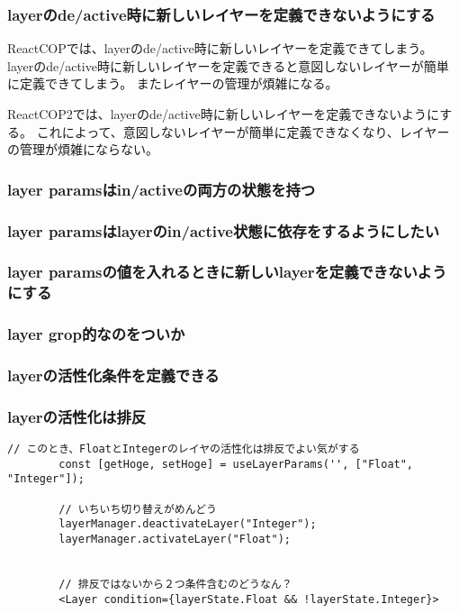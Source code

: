 \documentclass{jsarticle}
\begin{document}
    \subsubsection{layerのde/active時に新しいレイヤーを定義できないようにする}
    ReactCOPでは、layerのde/active時に新しいレイヤーを定義できてしまう。
    layerのde/active時に新しいレイヤーを定義できると意図しないレイヤーが簡単に定義できてしまう。
    またレイヤーの管理が煩雑になる。

    ReactCOP2では、layerのde/active時に新しいレイヤーを定義できないようにする。
    これによって、意図しないレイヤーが簡単に定義できなくなり、レイヤーの管理が煩雑にならない。


    \subsubsection{layer paramsはin/activeの両方の状態を持つ}

    \subsubsection{layer paramsはlayerのin/active状態に依存をするようにしたい}

    \subsubsection{layer paramsの値を入れるときに新しいlayerを定義できないようにする}

    \subsubsection{layer grop的なのをついか}

    \subsubsection{layerの活性化条件を定義できる}

    \subsubsection{layerの活性化は排反}
        \begin{lstlisting}[caption=hoge,label=fuga]
        // このとき、FloatとIntegerのレイヤの活性化は排反でよい気がする
        const [getHoge, setHoge] = useLayerParams('', ["Float", "Integer"]);

        // いちいち切り替えがめんどう
        layerManager.deactivateLayer("Integer");
        layerManager.activateLayer("Float");


        // 排反ではないから２つ条件含むのどうなん？
        <Layer condition={layerState.Float && !layerState.Integer}>
        \end{lstlisting}
\end{document}
